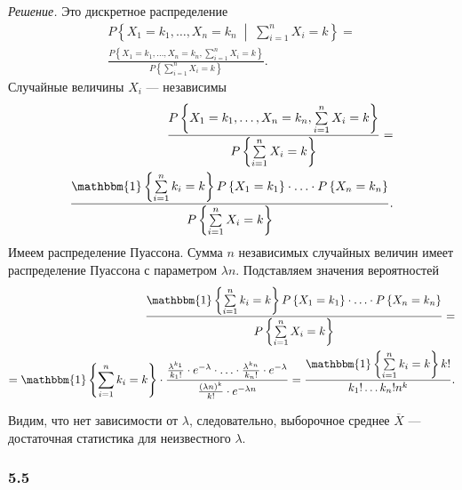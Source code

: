 \textit{Решение.} Это дискретное распределение
\begin{equation*}
  \begin{split}
    P \left\{ X_1 = k_1, \dotsc, X_n = k_n \; \middle| \; \sum \limits_{i = 1}^n X_i = k \right\} = \\
    \frac{P \left\{ X_1 = k_1, \dotsc, X_n = k_n, \sum \limits_{i = 1}^n X_i = k \right\} }{P \left\{ \sum \limits_{i = 1}^n X_i = k \right\} }.
  \end{split}
\end{equation*}
Случайные величины $X_i$ --- независимы
\begin{equation*}
  \begin{split}
    \frac{P \left\{ X_1 = k_1, \dotsc, X_n = k_n, \sum \limits_{i = 1}^n X_i = k \right\} }{P \left\{ \sum \limits_{i = 1}^n X_i = k \right\} } = \\
    \frac{ \mathbbm{1} \left\{ \sum \limits_{i = 1}^n k_i = k \right\} P \left\{ X_1 = k_1 \right\} \cdot \dotsc \cdot P \left\{ X_n = k_n \right\} }{P \left\{ \sum \limits_{i = 1}^n X_i = k \right\} }.
  \end{split}
\end{equation*}
Имеем распределение Пуассона.
Сумма $n$ независимых случайных величин имеет распределение Пуассона с параметром $ \lambda n$.
Подставляем значения вероятностей
\begin{equation*}
  \begin{split}
    \frac{ \mathbbm{1} \left\{ \sum \limits_{i = 1}^n k_i = k \right\} P \left\{ X_1 = k_1 \right\} \cdot \dotsc \cdot P \left\{ X_n = k_n \right\} }
          {P \left\{ \sum \limits_{i = 1}^n X_i = k \right\} } = \\
    = \mathbbm{1} \left\{ \sum \limits_{i = 1}^n k_i = k \right\} \cdot
    \frac{ \frac{ \lambda^{k_1}}{k_1!} \cdot e^{- \lambda } \cdot \dotsc \cdot \frac{ \lambda^{k_n}}{k_n!} \cdot e^{- \lambda }}
          { \frac{ \left( \lambda n \right)^k}{k!} \cdot e^{- \lambda n}} =
    \frac{ \mathbbm{1} \left\{ \sum \limits_{i = 1}^n k_i = k \right\} k!}{k_1! \dotsc k_n! n^k}.
  \end{split}
\end{equation*}

Видим, что нет зависимости от $ \lambda $, следовательно, выборочное среднее $ \overline{X}$ ---
достаточная статистика для неизвестного $ \lambda $.

\subsubsection{5.5}

